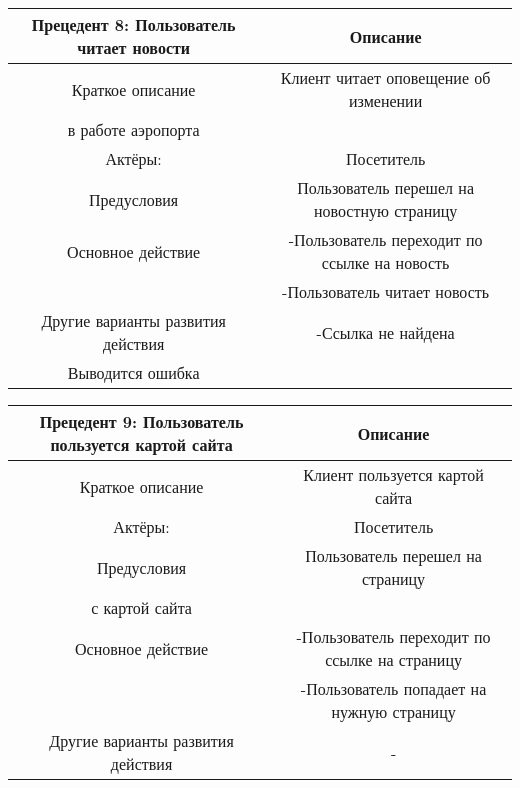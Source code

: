 \begin{table}
    \begin{tabular}{|c|c|}
    \hline
    Прецедент 8: Пользователь читает новости         & Описание                                                                                              \\ \hline
    Краткое описание                  & Клиент читает оповещение об изменении\\в работе аэропорта                                                        \\ \hline
    Актёры:                           & Посетитель                                                                                      \\ \hline
    Предусловия                       & Пользователь перешел на новостную страницу                                                                                          \\ \hline
    Основное действие                 & -Пользователь переходит по ссылке на новость\\ &-Пользователь читает новость\\ \hline
    Другие варианты развития действия & -Ссылка не найдена\\Выводится ошибка                                               \\ \hline
    \end{tabular}
\end{table}

\begin{table}
    \begin{tabular}{|c|c|}
    \hline
    Прецедент 9: Пользователь пользуется картой сайта         & Описание                                                                                              \\ \hline
    Краткое описание                  & Клиент пользуется картой сайта                                                     \\ \hline
    Актёры:                           & Посетитель                                                                                      \\ \hline
    Предусловия                       & Пользователь перешел на страницу\\ с картой сайта                                                                                       \\ \hline
    Основное действие                 & -Пользователь переходит по ссылке на страницу\\ &-Пользователь попадает на нужную страницу \\ \hline
    Другие варианты развития действия & -                                              \\ \hline
    \end{tabular}
\end{table}

